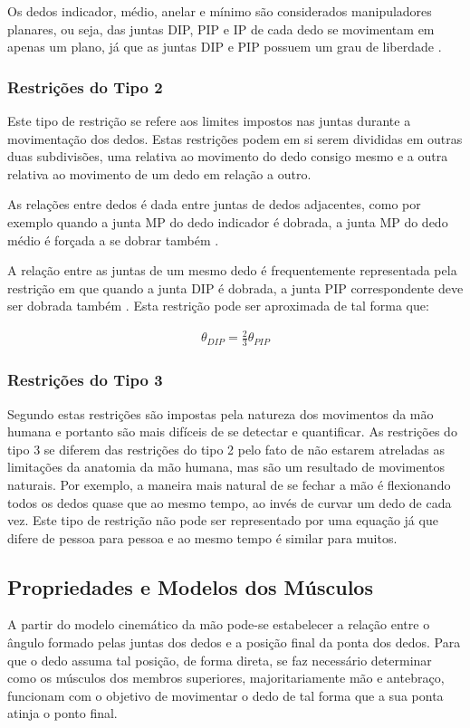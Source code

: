 Os dedos indicador, médio, anelar e mínimo são considerados manipuladores planares, ou seja, das juntas DIP, PIP e IP de cada dedo se movimentam em apenas um plano, já que as juntas DIP e PIP possuem um grau de liberdade \cite{lin2000modeling}.

\subsubsection{Restrições do Tipo 2}\label{sssec:Tipo2}
Este tipo de restrição se refere aos limites impostos nas juntas durante a movimentação dos dedos. Estas restrições podem em si serem divididas em outras duas subdivisões, uma relativa ao movimento do dedo consigo mesmo e a outra relativa ao movimento de um dedo em relação a outro.

As relações entre dedos é dada entre juntas de dedos adjacentes, como por exemplo quando a junta MP do dedo indicador é dobrada, a junta MP do dedo médio é forçada a se dobrar também \cite{lin2000modeling}.

A relação entre as juntas de um mesmo dedo é frequentemente representada pela restrição em que quando a junta DIP é dobrada, a junta PIP correspondente deve ser dobrada também \cite{lin2000modeling}\cite{lee1995model}. Esta restrição pode ser aproximada de tal forma que:

\begin{align}
\theta_{DIP} = \frac{2}{3} \theta_{PIP}
\end{align}

\subsubsection{Restrições do Tipo 3}\label{Tipo 3}
Segundo \cite{lin2000modeling} estas restrições são impostas pela natureza dos movimentos da mão humana e portanto são mais difíceis de se detectar e quantificar. As restrições do tipo 3 se diferem das restrições do tipo 2 pelo fato de não estarem atreladas as limitações da anatomia da mão humana, mas são um resultado de movimentos naturais. Por exemplo, a maneira mais natural de se fechar a mão é flexionando todos os dedos quase que ao mesmo tempo, ao invés de curvar um dedo de cada vez. Este tipo de restrição não pode ser representado por uma equação já que difere de pessoa para pessoa e ao mesmo tempo é similar para muitos.

\subsection{Propriedades e Modelos dos Músculos}\label{propriedades_musculo}
A partir do modelo cinemático da mão pode-se estabelecer a relação entre o ângulo formado pelas juntas dos dedos e a posição final da ponta dos dedos. Para que o dedo assuma tal posição, de forma direta, se faz necessário determinar como os músculos dos membros superiores, majoritariamente mão e antebraço, funcionam com o objetivo de movimentar o dedo de tal forma que a sua ponta atinja o ponto final.

